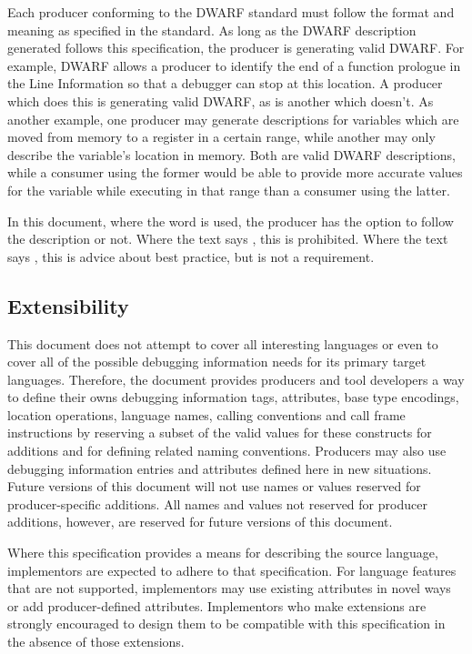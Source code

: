 Each producer conforming to the DWARF standard must follow the format and
meaning as specified in the standard.  As long as the DWARF description
generated follows this specification, the producer is generating valid DWARF.
For example, DWARF allows a producer to identify the end of a function
prologue in the Line Information so that a debugger can stop at this location.
A producer which does this is generating valid DWARF, as is another which
doesn't.  As another example, one producer may generate descriptions
for variables which are moved from memory to a register in a certain range,
while another may only describe the variable's location in memory.  Both are
valid DWARF descriptions, while a consumer using the former would be able
to provide more accurate values for the variable while executing in that
range than a consumer using the latter.

In this document, where the word  is used, the producer has
the option to follow the description or not.  Where the text says
, this is prohibited.  Where the text says ,
this is advice about best practice, but is not a requirement.

\bb
\subsection{Extensibility}
\eb
\label{chap:extensibility}
This document does not attempt to cover all interesting
languages or even to cover all of the possible debugging
information needs for its primary target languages.
Therefore, the document provides
\bb
producers and tool developers
\eb
a way to define their owns
debugging information tags, attributes, base type encodings,
location operations, language names, calling conventions and
call frame instructions by reserving a subset of the valid
values for these constructs for
additions and
\bb
for defining related naming conventions. Producers
\eb
may also use debugging information entries and attributes
defined here in new situations.
Future versions of this document will not use
names or values reserved for
\bb
producer-specific
\eb
additions.
All names and values not reserved for
\bb
producer
\eb
additions, however,
are reserved for future versions of this document.

Where this specification provides a means for
describing the source language, implementors are expected
to adhere to that specification. For language features that
are not supported, implementors may use existing attributes
in novel ways or add
\bb
producer-defined
\eb
attributes. Implementors
who make extensions are strongly encouraged to design them
to be compatible with this specification in the absence of
those extensions.

